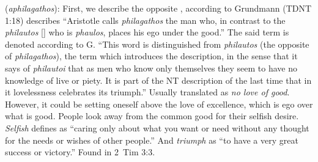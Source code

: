 \item[Selfish triumph,]

(\textit{aphilagathos}):
First, we describe the opposite , according to Grundmann (TDNT 1:18) describes ``Aristotle calls \emph{philagathos} the man who, in contrast to the \emph{philautos} [] who is \emph{phaulos}, places his ego under the good.''
The said term is denoted according to G. ``This word is distinguished from \emph{philautos} (the opposite of  \emph{philagathos}),  the term which introduces the description, in the sense that it says of \emph{philautoi} that as men who know only themselves they seem to have no knowledge of live or piety. It is part of the NT description of the last time that in it lovelessness celebrates its triumph.''
Usually translated as \emph{no love of good}. However, it could be setting oneself above the love of excellence, which is ego over what is good. People look away from the common good for their selfish desire. \emph{Selfish} defines as ``caring only about what you want or need without any thought for the needs or wishes of other people.'' And \emph{triumph} as ``to have a very great success or victory.''
Found in 2~Tim 3:3.
